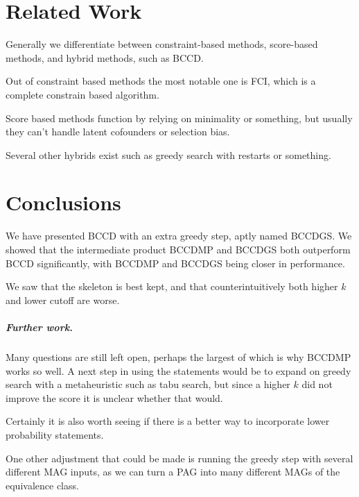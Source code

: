 \documentclass[11pt,a4paper]{report}
\theoremstyle{definition}
\begin{document}
\chapter{Related Work}\label{relatedwork}
Generally we differentiate between constraint-based methods, score-based
methods, and hybrid methods, such as BCCD.

Out of constraint based methods the most notable one is
FCI\cite{spirtesCausationPredictionSearch2000}, which is a complete
\cite{zhangCompletenessOrientationRules2008} constrain based algorithm.

Score based methods function by relying on minimality or something, but
usually they can't handle latent cofounders or selection bias.

Several other hybrids exist such as greedy search with restarts or
something.


\chapter{Conclusions}\label{conclusions}
We have presented BCCD with an extra greedy step, aptly named BCCDGS. We
showed that the intermediate product BCCDMP and BCCDGS both outperform
BCCD significantly, with BCCDMP and BCCDGS being closer in performance.

We saw that the skeleton is best kept, and that counterintuitively both
higher $k$ and lower cutoff are worse.

\paragraph{Further work.}
Many questions are still left open, perhaps the largest of which is why
BCCDMP works so well. A next step in using the statements would be to
expand on greedy search with a metaheuristic such as tabu search, but
since a higher $k$ did not improve the score it is unclear whether that
would.

Certainly it is also worth seeing if there is a better way to incorporate
lower probability statements.

One other adjustment that could be made is running the greedy step with
several different MAG inputs, as we can turn a PAG into many different
MAGs of the equivalence class.

\printbibliography


\end{document}
